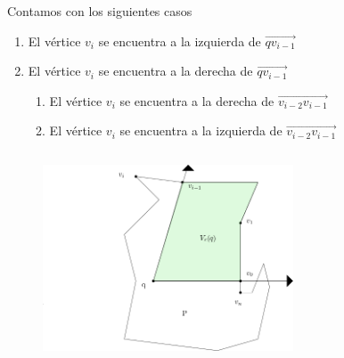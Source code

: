 \documentclass[aspectratio=169,xcolor=dvipsnames, t]{beamer}
\begin{document}

\begin{frame}%
    Contamos con los siguientes casos
    \begin{center}
    \begin{enumerate}
        \item El vértice $v_{i}$ se encuentra a la izquierda de $\overrightarrow{qv_{i-1}}$
        \item El vértice $v_{i}$ se encuentra a la derecha de $\overrightarrow{qv_{i-1}}$
            \begin{enumerate}
                \item El vértice $v_{i}$ se encuentra a la derecha de $\overrightarrow{v_{i-2}v_{i-1}}$
                \item El vértice $v_{i}$ se encuentra a la izquierda de $\overrightarrow{v_{i-2}v_{i-1}}$
            \end{enumerate}
    \end{enumerate}
    \end{center}
    \begin{columns}
      \begin{column}{0.33\textwidth}
        \vspace{-1cm}
        \begin{figure}
          \centering
          \includegraphics[width=0.8\textwidth]{imagenes/Caso2.4a.png}
        \end{figure}
      \end{column}
      \begin{column}{0.33\textwidth}
        \begin{figure}
          \vspace{-1cm}

\end{figure}
\end{column}
\end{columns}
\end{frame}
\end{document}

